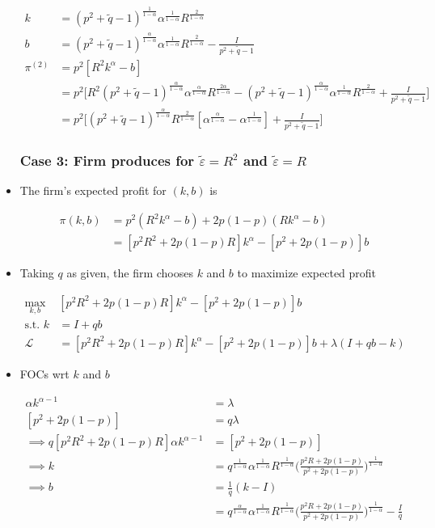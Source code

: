 \documentclass{article}
\newcommand{\Lfn}{\mathcal{L}}
\begin{document}
\begin{itemize}
\begin{align*}
k &= (p^2 + \tilde q  - 1)^{\frac{1}{1-\alpha}}\alpha^{\frac{1}{1-\alpha}}  R^{\frac{2}{1-\alpha}}  \\
b &= (p^2 + \tilde q  - 1)^{\frac{\alpha}{1-\alpha}}\alpha^{\frac{1}{1-\alpha}}  R^{\frac{2}{1-\alpha}}   - \frac{I}{p^2 + \tilde q  - 1}\\
\pi^{(2)} 
&= p^2 [R^2 k^\alpha - b] \\
&= p^2 \Bigg[ R^2 (p^2 + \tilde q  - 1)^{\frac{\alpha}{1-\alpha}}\alpha^{\frac{\alpha}{1-\alpha}}  R^{\frac{2\alpha}{1-\alpha}} - (p^2 + \tilde q  - 1)^{\frac{\alpha}{1-\alpha}}\alpha^{\frac{1}{1-\alpha}}  R^{\frac{2}{1-\alpha}}   + \frac{I}{p^2 + \tilde q  - 1} \Bigg]\\
&= p^2 \Bigg[ (p^2 + \tilde q  - 1)^{\frac{\alpha}{1-\alpha}}R^\frac{2}{1-\alpha} [ \alpha^{\frac{\alpha}{1-\alpha}}  - \alpha^{\frac{1}{1-\alpha}}]   + \frac{I}{p^2 + \tilde q  - 1} \Bigg]
\end{align*}

\subsubsection*{Case 3: Firm produces for $\tilde \varepsilon = R^2$ and $\tilde \varepsilon = R$}

\item The firm's expected profit for $(k,b)$ is

\begin{align*}
\pi(k,b) 
&= p^2 (R^2 k^\alpha - b) + 2p(1-p) (R k^\alpha - b)\\
&= [p^2 R^2 + 2p(1-p) R ] k^\alpha - [p^2 + 2p(1-p)]b
\end{align*}

\item Taking $q$ as given, the firm chooses $k$ and $b$ to maximize expected profit

\begin{align*}
\max_{k,b} & [p^2 R^2 + 2p(1-p) R ] k^\alpha - [p^2 + 2p(1-p)]b\\
\text{s.t. } k &= I + qb\\
\Lfn &= [p^2 R^2 + 2p(1-p) R ] k^\alpha - [p^2 + 2p(1-p)]b + \lambda(I + qb - k)
\end{align*}

\item FOCs wrt $k$ and $b$

\begin{align*}
[p^2 R^2 + 2p(1-p) R ] \alpha k^{\alpha-1}  &= \lambda\\
[p^2 + 2p(1-p)]  &= q \lambda\\
\implies
q[p^2 R^2 + 2p(1-p) R ] \alpha k^{\alpha-1} &= [p^2 + 2p(1-p)] \\
\implies
k 
&= q^{\frac{1}{1-\alpha}} \alpha^{\frac{1}{1-\alpha}} R^{\frac{1}{1-\alpha}}\Bigg(\frac{p^2 R + 2p(1-p) }{p^2 + 2p(1-p)}\Bigg)^{\frac{1}{1-\alpha}}\\
\implies
b &= \frac{1}{q}(k - I)\\
&= q^{\frac{\alpha}{1-\alpha}} \alpha^{\frac{1}{1-\alpha}} R^{\frac{1}{1-\alpha}}\Bigg(\frac{p^2 R + 2p(1-p) }{p^2 + 2p(1-p)}\Bigg)^{\frac{1}{1-\alpha}} - \frac{I}{q}
\end{align*}


\end{itemize}
\end{document}
